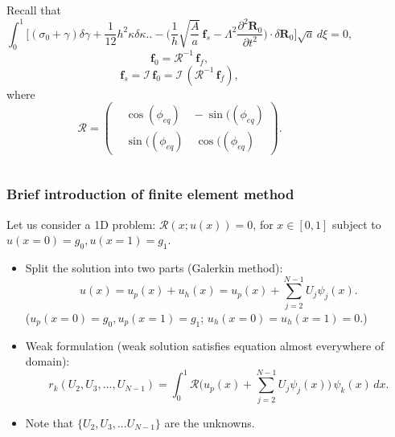 \documentclass{beamer}
\newcommand{\bi}{\begin{itemize}}
\newcommand{\ei}{\end{itemize}}
\begin{document}
\begin{frame}
\begin{overlayarea}{\textwidth}{\textheight}
\begin{columns}
		\tiny
		Recall that
		\begin{equation*}
			\int_0^1 \Bigg[ (\sigma_0 + \gamma) \delta \gamma 
			+ \frac{1}{12} h^2 \kappa \delta \kappa \Bigg. 
			\Bigg. - \Bigg( \frac{1}{h} \sqrt{\frac{A}{a}}\, \textbf{f}_s - \Lambda^2 \frac{\partial^2 \textbf{R}_0}{\partial t^2} \Bigg) 
			\cdot \delta \textbf{R}_0 \Bigg] \sqrt{a}\, d\xi = 0,
		\end{equation*}
			\vspace{-2cm}
			\footnotesize
\begin{equation*}
	\textbf{f}_0=\mathcal{R}^{-1}\,\textbf{f}_f,
\end{equation*}
\begin{equation*}
	\textbf{f}_s=\mathcal{I}\,\textbf{f}_0=\mathcal{I}\,\left(\mathcal{R}^{-1}\,\textbf{f}_f\right),
\end{equation*}
where
 $$\mathbf{\mathcal{R}}=\left(\begin{aligned}
	&\cos(\phi_{eq})\quad -\sin((\phi_{eq}) \\
	&\sin((\phi_{eq})\quad \cos((\phi_{eq})
\end{aligned}\right). $$
		\end{columns}
	\end{overlayarea}
\end{frame}




\begin{frame}
	\frametitle{Brief introduction of finite element method}
	\begin{overlayarea}{\textwidth}{\textheight}
Let us consider a 1D problem: $\mathcal{R}(x;u(x))=0$, for $ x\in [0,1]$ subject to $u(x=0)=g_0, u(x=1)=g_1$.
\small\bi
\item Split the solution into two parts (Galerkin method): \vspace{-0.2cm}$$u(x)=u_p(x)+u_h(x)=u_p(x)+\sum^{N-1}_{j=2}U_j\psi_j(x).$$
($u_p(x=0)=g_0,u_p(x=1)=g_1$; $u_h(x=0)=u_h(x=1)=0$.)
\item Weak formulation (weak solution satisfies equation almost everywhere of domain): $$r_k(U_2,U_3,...,U_{N-1})=\int^1_0\mathcal{R}\Bigg(u_p(x)+\sum^{N-1}_{j=2}U_j\psi_j(x)\Bigg)\,\psi_k(x)\,dx.$$
\item Note that $\{U_2,U_3,...U_{N-1}\}$ are the unknowns. 
\ei
	
	

	\end{overlayarea}
\end{frame}
\end{document}
